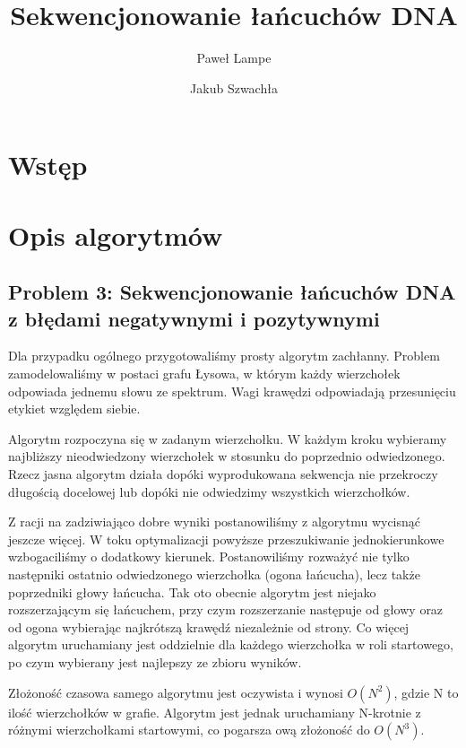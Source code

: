 \documentclass[a4paper]{article}
\title{\textbf{Sekwencjonowanie łańcuchów DNA}}
\date{}
\author{Paweł Lampe \and Jakub Szwachła}
\begin{document}
\maketitle

\section{Wstęp}

\section{Opis algorytmów}

\subsection{Problem 3: Sekwencjonowanie łańcuchów DNA z błędami negatywnymi i pozytywnymi}      %

Dla przypadku ogólnego przygotowaliśmy prosty algorytm zachłanny. Problem zamodelowaliśmy w postaci grafu Łysowa,
w którym każdy wierzchołek odpowiada jednemu słowu ze spektrum. Wagi krawędzi odpowiadają przesunięciu etykiet
względem siebie.

Algorytm rozpoczyna się w zadanym wierzchołku. W każdym kroku wybieramy najbliższy nieodwiedzony wierzchołek w stosunku
do poprzednio odwiedzonego. Rzecz jasna algorytm działa dopóki wyprodukowana sekwencja nie przekroczy długością docelowej
lub dopóki nie odwiedzimy wszystkich wierzchołków.

Z racji na zadziwiająco dobre wyniki postanowiliśmy z algorytmu wycisnąć jeszcze więcej. W toku optymalizacji powyższe
przeszukiwanie jednokierunkowe wzbogaciliśmy o dodatkowy kierunek. Postanowiliśmy rozważyć nie tylko następniki ostatnio
odwiedzonego wierzchołka (ogona łańcucha), lecz także poprzedniki głowy łańcucha. Tak oto obecnie
algorytm jest niejako rozszerzającym się łańcuchem, przy czym rozszerzanie następuje od głowy oraz od ogona
wybierając najkrótszą krawędź niezależnie od strony. Co więcej algorytm uruchamiany jest oddzielnie dla każdego
wierzchołka w roli startowego, po czym wybierany jest najlepszy ze zbioru wyników.

Złożoność czasowa samego algorytmu jest oczywista i wynosi $O(N^2)$, gdzie N to ilość wierzchołków w grafie. Algorytm jest
jednak uruchamiany N-krotnie z różnymi wierzchołkami startowymi, co pogarsza ową złożoność do $O(N^3)$.

\end{document}
